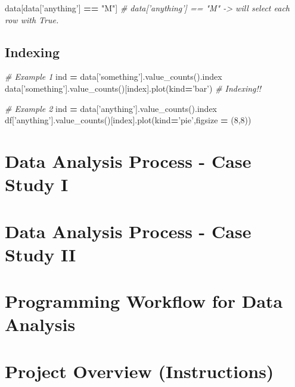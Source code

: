 \documentclass[]{book}
\newenvironment{Shaded}{\begin{snugshade}}{\end{snugshade}}
\newcommand{\DecValTok}[1]{\textcolor[rgb]{0.00,0.00,0.81}{#1}}
\newcommand{\StringTok}[1]{\textcolor[rgb]{0.31,0.60,0.02}{#1}}
\newcommand{\CommentTok}[1]{\textcolor[rgb]{0.56,0.35,0.01}{\textit{#1}}}
\newcommand{\OperatorTok}[1]{\textcolor[rgb]{0.81,0.36,0.00}{\textbf{#1}}}
\newcommand{\NormalTok}[1]{#1}
\begin{document}
\begin{Shaded}
\begin{Highlighting}[]
\NormalTok{data[data[}\StringTok{'anything'}\NormalTok{] }\OperatorTok{==} \StringTok{"M"}\NormalTok{] }\CommentTok{# data['anything'] == "M" -> will select each row with True.}
\end{Highlighting}
\end{Shaded}

\subsection{Indexing}\label{indexing}

\begin{Shaded}
\begin{Highlighting}[]
\CommentTok{# Example 1}
\NormalTok{ind }\OperatorTok{=}\NormalTok{ data[}\StringTok{'something'}\NormalTok{].value_counts().index}
\NormalTok{data[}\StringTok{'something'}\NormalTok{].value_counts()[index].plot(kind}\OperatorTok{=}\StringTok{'bar'}\NormalTok{) }\CommentTok{# Indexing!!}

\CommentTok{# Example 2}
\NormalTok{ind }\OperatorTok{=}\NormalTok{ data[}\StringTok{'anything'}\NormalTok{].value_counts().index}
\NormalTok{df[}\StringTok{'anything'}\NormalTok{].value_counts()[index].plot(kind}\OperatorTok{=}\StringTok{'pie'}\NormalTok{,figsize }\OperatorTok{=}\NormalTok{ (}\DecValTok{8}\NormalTok{,}\DecValTok{8}\NormalTok{))}
\end{Highlighting}
\end{Shaded}

\section{Data Analysis Process - Case Study
I}\label{data-analysis-process---case-study-i}

\section{Data Analysis Process - Case Study
II}\label{data-analysis-process---case-study-ii}

\section{Programming Workflow for Data
Analysis}\label{programming-workflow-for-data-analysis}

\section{Project Overview
(Instructions)}\label{project-overview-instructions-1}
\end{document}
